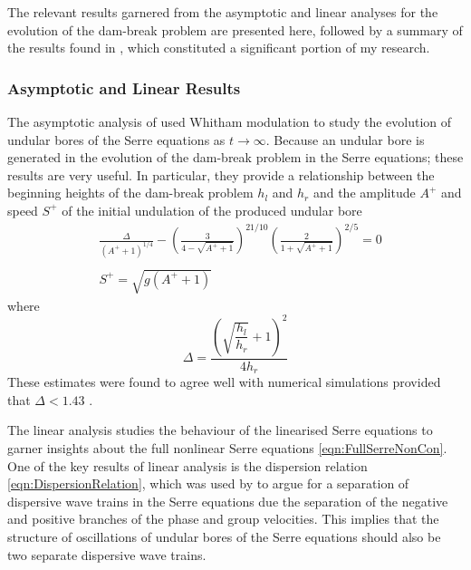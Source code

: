 The relevant results garnered from the asymptotic \cite{El-etal-2006} and linear \cite{Dougalis-etal-2007} analyses for the evolution of the dam-break problem are presented here, followed by a summary of the results found in \cite{Pitt-2018-61}, which constituted a significant portion of my research. 

\subsubsection{Asymptotic and Linear Results}
The asymptotic analysis of \citet{El-etal-2006} used Whitham modulation to study the evolution of undular bores of the Serre equations as $t\rightarrow \infty$. Because an undular bore is generated in the evolution of the dam-break problem in the Serre equations; these results are very useful. In particular, they provide a relationship between the beginning heights of the dam-break problem $h_l$ and $h_r$ and the amplitude $A^+$ and speed $S^+$ of the initial undulation of the produced undular bore  
\begin{subequations}
	\begin{align}
	&\frac{\Delta}{\left(A^+ + 1\right)^{1/4}} - \left(\frac{3}{4 -  \sqrt{A^+ + 1}}\right)^{21/10} \left(\frac{2}{1 + \sqrt{A^+ + 1}}\right)^{2/5} = 0	\label{eqn:Aplusdef} \\  \nonumber \\
	&S^+ = \sqrt{g \left(A^+ + 1\right)}	\label{eqn:Splusdef}
	\end{align}
	\label{eqn:ELWhitMod}	
\end{subequations}
where
\begin{equation}
\Delta = \frac{\left(\sqrt{\dfrac{h_l}{h_r}} + 1\right)^2}{4 h_r}
\end{equation}
These estimates were found to agree well with numerical simulations provided that $\Delta < 1.43$ \cite{El-etal-2006}.

The linear analysis studies the behaviour of the linearised Serre equations to garner insights about the full nonlinear Serre equations \eqref{eqn:FullSerreNonCon}. One of the key results of linear analysis is the dispersion relation \eqref{eqn:DispersionRelation}, which was used by \citet{Dougalis-etal-2007} to argue for a separation of dispersive wave trains in the Serre equations due the separation of the negative and positive branches of the phase and group velocities. This implies that the structure of oscillations of undular bores of the Serre equations should also be two separate dispersive wave trains.


